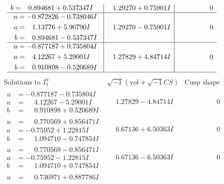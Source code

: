 \documentclass[1p]{elsarticle_modified}
\theoremstyle{definition}
\newcommand{\I}{\sqrt{-1}}
\begin{document}
$$\begin{array}{c|c|c}
\begin{aligned}
b &= \phantom{-}0.894681 + 0.537347 I\end{aligned}
 & \phantom{-}1.29270 + 0.75901 I & \phantom{-0.000000 } 0 \\ \hline\begin{aligned}
u &= -0.872826 - 0.738046 I \\
a &= \phantom{-}1.13776 + 5.90790 I \\
b &= \phantom{-}0.894681 - 0.537347 I\end{aligned}
 & \phantom{-}1.29270 - 0.75901 I & \phantom{-0.000000 } 0 \\ \hline\begin{aligned}
u &= -0.877187 + 0.735804 I \\
a &= \phantom{-}4.12267 + 5.29001 I \\
b &= \phantom{-}0.910898 - 0.520689 I\end{aligned}
 & \phantom{-}1.27829 + 4.84714 I & \phantom{-0.000000 } 0\\
 \hline 
 \end{array}$$\newpage$$\begin{array}{c|c|c}  
\text{Solutions to }I^u_{1}& \I (\text{vol} + \sqrt{-1}CS) & \text{Cusp shape}\\
 \hline 
\begin{aligned}
u &= -0.877187 - 0.735804 I \\
a &= \phantom{-}4.12267 - 5.29001 I \\
b &= \phantom{-}0.910898 + 0.520689 I\end{aligned}
 & \phantom{-}1.27829 - 4.84714 I & \phantom{-0.000000 } 0 \\ \hline\begin{aligned}
u &= \phantom{-}0.770569 + 0.856471 I \\
a &= -0.75952 + 1.22815 I \\
b &= \phantom{-}1.094710 - 0.747854 I\end{aligned}
 & \phantom{-}6.67136 + 6.50363 I & \phantom{-0.000000 } 0 \\ \hline\begin{aligned}
u &= \phantom{-}0.770569 - 0.856471 I \\
a &= -0.75952 - 1.22815 I \\
b &= \phantom{-}1.094710 + 0.747854 I\end{aligned}
 & \phantom{-}6.67136 - 6.50363 I & \phantom{-0.000000 } 0 \\ \hline\begin{aligned}
u &= \phantom{-}0.736971 + 0.887786 I \\

\end{aligned}
\end{array}$$
\end{document}
